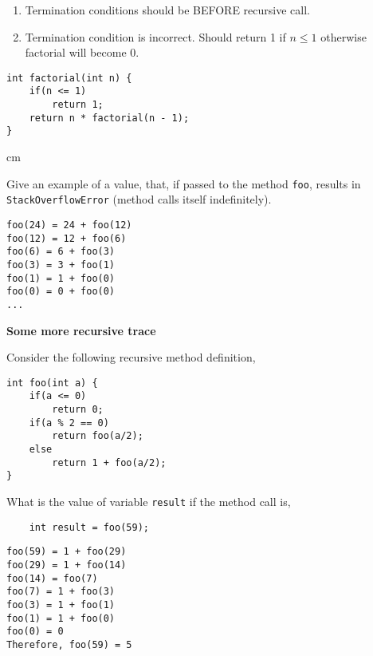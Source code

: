 \begin{questions}
\begin{solution}
\begin{enumerate}
\item Termination conditions should be BEFORE recursive call.
\item Termination condition is incorrect. Should return 1 if $n \leq 1$ otherwise factorial will become 0.
\end{enumerate}

\begin{lstlisting}
int factorial(int n) {
	if(n <= 1)
		return 1;
	return n * factorial(n - 1);
}
\end{lstlisting}
	
\end{solution}

 cm 

Give an example of a value, that, if passed to the method \texttt{foo}, results in \texttt{StackOverflowError} (method calls itself indefinitely).

\begin{solution}
\begin{verbatim}
foo(24) = 24 + foo(12)
foo(12) = 12 + foo(6)
foo(6) = 6 + foo(3)
foo(3) = 3 + foo(1)
foo(1) = 1 + foo(0)
foo(0) = 0 + foo(0)
...	
\end{verbatim}
\end{solution}

\newpage

\question  \textbf{Some more recursive trace} \vskip 0.5cm

Consider the following recursive method definition,

\begin{lstlisting}
int foo(int a) {
	if(a <= 0)
		return 0;
	if(a % 2 == 0)
		return foo(a/2);
	else
		return 1 + foo(a/2);
}
\end{lstlisting}

What is the value of variable \texttt{result} if the method call is,

\begin{lstlisting}
	int result = foo(59);
\end{lstlisting}

\begin{solution}
\begin{verbatim}
foo(59) = 1 + foo(29)
foo(29) = 1 + foo(14)
foo(14) = foo(7)
foo(7) = 1 + foo(3)
foo(3) = 1 + foo(1)
foo(1) = 1 + foo(0)
foo(0) = 0
Therefore, foo(59) = 5
\end{verbatim}
\end{solution}


\end{questions}
